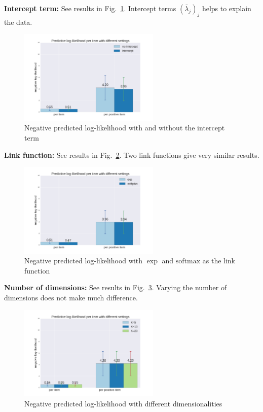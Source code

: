 \documentclass{article}
\begin{document}
{\bf Intercept term: } See results in Fig.~\ref{fig_intercept_term}. Intercept terms $(\bar{\lambda}_j)_j$ helps to explain the data. 
\begin{figure}[t]
    \centering
    \includegraphics[width=0.6\textwidth]{figures/intercept_term.png}
    \caption{Negative predicted log-likelihood with and without the intercept term}
    \label{fig_intercept_term}
\end{figure}



{\bf Link function:} See results in Fig.~\ref{fig_link_func}. Two link functions give very similar results. 
\begin{figure}[t]
    \centering
    \includegraphics[width=0.6\textwidth]{figures/link_func.png}
    \caption{Negative predicted log-likelihood with $\exp$ and $\mathrm{softmax}$ as the link function}
    \label{fig_link_func}
\end{figure}

{\bf Number of dimensions:} See results in Fig.~\ref{fig_dimensionality}. Varying the number of dimensions does not make much difference. 
\begin{figure}[t]
    \centering
    \includegraphics[width=0.6\textwidth]{figures/variate_K.png}
    \caption{Negative predicted log-likelihood with different dimensionalities}
    \label{fig_dimensionality}
\end{figure}
\end{document}
